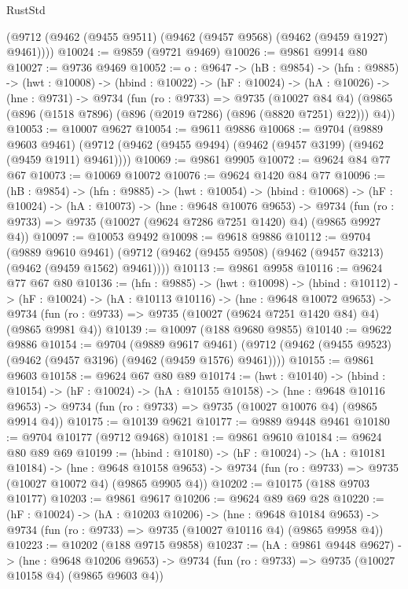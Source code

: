 \begin{lexlean}{RustStd}
\begin{coremodule}
    (@9712 (@9462 (@9455 @9511) (@9462 (@9457 @9568) (@9462 (@9459 @1927) @9461))))
@10024 := @9859 (@9721 @9469)
@10026 := @9861 @9914 @80
@10027 := @9736 @9469
@10052 := {o : @9647} ->
  (hB : @9854) ->
  (hfn : @9885) ->
  (hwt : @10008) ->
  (hbind : @10022) ->
  (hF : @10024) ->
  (hA : @10026) ->
  (hne : @9731) ->
  @9734
    (fun (ro : @9733) =>
    @9735
      (@10027 @84 @4)
      (@9865 (@896 (@1518 @7896) (@896 (@2019 @7286) (@896 (@8820 @7251) @22))) @4))
@10053 := @10007 @9627
@10054 := @9611 @9886
@10068 := @9704
    (@9889 @9603 @9461)
    (@9712 (@9462 (@9455 @9494) (@9462 (@9457 @3199) (@9462 (@9459 @1911) @9461))))
@10069 := @9861 @9905
@10072 := @9624 @84 @77 @67
@10073 := @10069 @10072
@10076 := @9624 @1420 @84 @77
@10096 := (hB : @9854) ->
  (hfn : @9885) ->
  (hwt : @10054) ->
  (hbind : @10068) ->
  (hF : @10024) ->
  (hA : @10073) ->
  (hne : @9648 @10076 @9653) ->
  @9734 (fun (ro : @9733) => @9735 (@10027 (@9624 @7286 @7251 @1420) @4) (@9865 @9927 @4))
@10097 := @10053 @9492
@10098 := @9618 @9886
@10112 := @9704
    (@9889 @9610 @9461)
    (@9712 (@9462 (@9455 @9508) (@9462 (@9457 @3213) (@9462 (@9459 @1562) @9461))))
@10113 := @9861 @9958
@10116 := @9624 @77 @67 @80
@10136 := (hfn : @9885) ->
  (hwt : @10098) ->
  (hbind : @10112) ->
  (hF : @10024) ->
  (hA : @10113 @10116) ->
  (hne : @9648 @10072 @9653) ->
  @9734 (fun (ro : @9733) => @9735 (@10027 (@9624 @7251 @1420 @84) @4) (@9865 @9981 @4))
@10139 := @10097 (@188 @9680 @9855)
@10140 := @9622 @9886
@10154 := @9704
    (@9889 @9617 @9461)
    (@9712 (@9462 (@9455 @9523) (@9462 (@9457 @3196) (@9462 (@9459 @1576) @9461))))
@10155 := @9861 @9603
@10158 := @9624 @67 @80 @89
@10174 := (hwt : @10140) ->
  (hbind : @10154) ->
  (hF : @10024) ->
  (hA : @10155 @10158) ->
  (hne : @9648 @10116 @9653) ->
  @9734 (fun (ro : @9733) => @9735 (@10027 @10076 @4) (@9865 @9914 @4))
@10175 := @10139 @9621
@10177 := @9889 @9448 @9461
@10180 := @9704 @10177 (@9712 @9468)
@10181 := @9861 @9610
@10184 := @9624 @80 @89 @69
@10199 := (hbind : @10180) ->
  (hF : @10024) ->
  (hA : @10181 @10184) ->
  (hne : @9648 @10158 @9653) ->
  @9734 (fun (ro : @9733) => @9735 (@10027 @10072 @4) (@9865 @9905 @4))
@10202 := @10175 (@188 @9703 @10177)
@10203 := @9861 @9617
@10206 := @9624 @89 @69 @28
@10220 := (hF : @10024) ->
  (hA : @10203 @10206) ->
  (hne : @9648 @10184 @9653) ->
  @9734 (fun (ro : @9733) => @9735 (@10027 @10116 @4) (@9865 @9958 @4))
@10223 := @10202 (@188 @9715 @9858)
@10237 := (hA : @9861 @9448 @9627) ->
  (hne : @9648 @10206 @9653) ->
  @9734 (fun (ro : @9733) => @9735 (@10027 @10158 @4) (@9865 @9603 @4))

\end{coremodule}
\end{lexlean}
